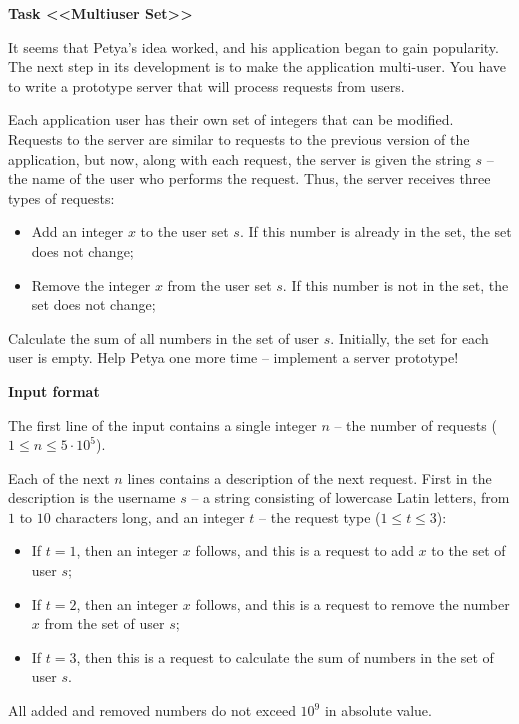 \documentclass[a4paper]{article}
\begin{document}
\textbf{Task <<Multiuser Set>>}

It seems that Petya's idea worked, and his application began to gain popularity. The next step in its development is to make the application multi-user. You have to write a prototype server that will process requests from users.

Each application user has their own set of integers that can be modified. Requests to the server are similar to requests to the previous version of the application, but now, along with each request, the server is given the string $s$ -- the name of the user who performs the request. Thus, the server receives three types of requests:
\begin{itemize}
\item Add an integer $x$ to the user set $s$. If this number is already in the set, the set does not change;
\item Remove the integer $x$ from the user set $s$. If this number is not in the set, the set does not change;
\end{itemize}

Calculate the sum of all numbers in the set of user $s$.
Initially, the set for each user is empty. Help Petya one more time -- implement a server prototype!

\SPACE

\textbf{Input format}

The first line of the input contains a single integer $n$ -- the number of requests ($1 \le n \le 5 \cdot 10^5$).

Each of the next $n$ lines contains a description of the next request. First in the description is the username $s$ -- a string consisting of lowercase Latin letters, from $1$ to $10$ characters long, and an integer $t$ -- the request type ($1 \le t \le 3$):
\begin{itemize}
\item If $t = 1$, then an integer $x$ follows, and this is a request to add $x$ to the set of user $s$;
\item If $t = 2$, then an integer $x$ follows, and this is a request to remove the number $x$ from the set of user $s$;
\item If $t = 3$, then this is a request to calculate the sum of numbers in the set of user $s$.
\end{itemize}

All added and removed numbers do not exceed $10^9$ in absolute value.

\SPACE
\end{document}
